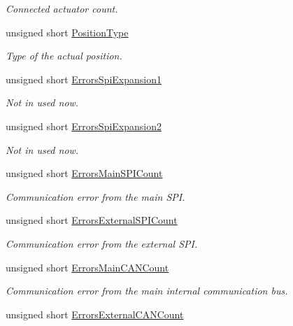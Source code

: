 \begin{DoxyCompactItemize}
\begin{DoxyCompactList}\small\item\em Connected actuator count. \end{DoxyCompactList}\item 
unsigned short \hyperlink{struct_general_informations_aaca0e478d0550e1c1763fcf8efe0c561}{Position\+Type}
\begin{DoxyCompactList}\small\item\em Type of the actual position. \end{DoxyCompactList}\item 
unsigned short \hyperlink{struct_general_informations_a81b7dea1c9cbcbc985eca648a8c5075c}{Errors\+Spi\+Expansion1}
\begin{DoxyCompactList}\small\item\em Not in used now. \end{DoxyCompactList}\item 
unsigned short \hyperlink{struct_general_informations_afcd202e8b7851289121ce9b5fd2b2dca}{Errors\+Spi\+Expansion2}
\begin{DoxyCompactList}\small\item\em Not in used now. \end{DoxyCompactList}\item 
unsigned short \hyperlink{struct_general_informations_a810315cbb3a170f9a1124e52cc22d59c}{Errors\+Main\+S\+P\+I\+Count}
\begin{DoxyCompactList}\small\item\em Communication error from the main S\+PI. \end{DoxyCompactList}\item 
unsigned short \hyperlink{struct_general_informations_a53e3e2b371092bf2f0fbc922d7dff8f3}{Errors\+External\+S\+P\+I\+Count}
\begin{DoxyCompactList}\small\item\em Communication error from the external S\+PI. \end{DoxyCompactList}\item 
unsigned short \hyperlink{struct_general_informations_aa2ae45e90dae092075b4662268757868}{Errors\+Main\+C\+A\+N\+Count}
\begin{DoxyCompactList}\small\item\em Communication error from the main internal communication bus. \end{DoxyCompactList}\item 
unsigned short \hyperlink{struct_general_informations_ac7ac1443cdd9f470fda64cd077ce06fb}{Errors\+External\+C\+A\+N\+Count}

\end{DoxyCompactItemize}
